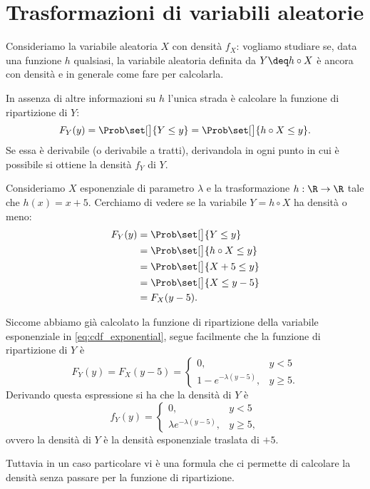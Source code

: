 \section{Trasformazioni di variabili aleatorie}

Consideriamo la variabile aleatoria $X$ con densità $f_X$: vogliamo studiare se, data una funzione $h$ qualsiasi, la variabile aleatoria definita da $Y \deq h \circ X$ è ancora con densità e in generale come fare per calcolarla.

In assenza di altre informazioni su $h$ l'unica strada è calcolare la funzione di ripartizione di $Y$: \[
    F_Y(y) = \Prob\set[\big]{Y \leq y} = \Prob\set[\big]{h \circ X \leq y}.    
\] Se essa è derivabile (o derivabile a tratti), derivandola in ogni punto in cui è possibile si ottiene la densità $f_Y$ di $Y$.

\begin{example}
    Consideriamo $X$ esponenziale di parametro $\lambda$ e la trasformazione $h : \R \to \R$ tale che $h(x) = x + 5$. Cerchiamo di vedere se la variabile $Y = h \circ X$ ha densità o meno: \begin{align*}
            F_Y(y) 
        &= \Prob\set[\big]{Y \leq y}\\
        &= \Prob\set[\big]{h \circ X \leq y} \\
        &= \Prob\set[\big]{X + 5 \leq y}\\
        &= \Prob\set[\big]{X \leq y - 5}\\
        &= F_X(y-5).
    \end{align*}

    Siccome abbiamo già calcolato la funzione di ripartizione della variabile esponenziale in \eqref{eq:cdf_exponential}, segue facilmente che la funzione di ripartizione di $Y$ è \[
        F_Y(y) = F_X(y-5) = \begin{cases}
            0, &y < 5\\
            1 - e^{-\lambda(y-5)}, &y \geq 5.
        \end{cases}    
    \] Derivando questa espressione si ha che la densità di $Y$ è \[
        f_Y(y) = \begin{cases}
            0, &y < 5\\
            \lambda e^{-\lambda(y-5)}, &y \geq 5,
        \end{cases}    
    \] ovvero la densità di $Y$ è la densità esponenziale traslata di $+5$.
\end{example}

Tuttavia in un caso particolare vi è una formula che ci permette di calcolare la densità senza passare per la funzione di ripartizione.

